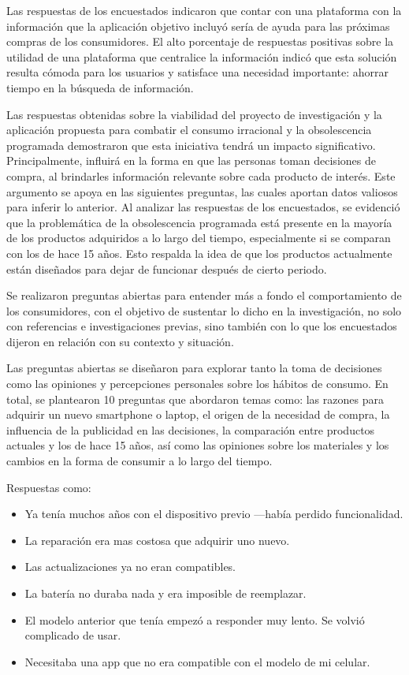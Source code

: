 Las respuestas de los encuestados indicaron que contar con una plataforma con la
información que la aplicación objetivo incluyó sería de ayuda para las
próximas compras de los consumidores. El alto porcentaje de respuestas positivas
sobre la utilidad de una plataforma que centralice la información indicó que
esta solución resulta cómoda para los usuarios y satisface una necesidad
importante: ahorrar tiempo en la búsqueda de información.

Las respuestas obtenidas sobre la viabilidad del proyecto de investigación y la
aplicación propuesta para combatir el consumo irracional y la obsolescencia
programada demostraron que esta iniciativa tendrá un impacto significativo.
Principalmente, influirá en la forma en que las personas toman decisiones de
compra, al brindarles información relevante sobre cada producto de interés. Este
argumento se apoya en las siguientes preguntas, las cuales aportan datos
valiosos para inferir lo anterior. Al analizar las respuestas de los
encuestados, se evidenció que la problemática de la obsolescencia programada
está presente en la mayoría de los productos adquiridos a lo largo del tiempo,
especialmente si se comparan con los de hace 15 años. Esto respalda la idea de
que los productos actualmente están diseñados para dejar de funcionar después de
cierto periodo.

Se realizaron preguntas abiertas para entender más a fondo el comportamiento de
los consumidores, con el objetivo de sustentar lo dicho en la investigación, no
solo con referencias e investigaciones previas, sino también con lo que los
encuestados dijeron en relación con su contexto y situación. 

Las preguntas abiertas se diseñaron para explorar tanto la toma de decisiones
como las opiniones y percepciones personales sobre los hábitos de consumo. En
total, se plantearon 10 preguntas que abordaron temas como: las razones para
adquirir un nuevo smartphone o laptop, el origen de la necesidad de compra, la
influencia de la publicidad en las decisiones, la comparación entre productos
actuales y los de hace 15 años, así como las opiniones sobre los materiales y
los cambios en la forma de consumir a lo largo del tiempo.

Respuestas como:
\begin{itemize}
    \item Ya tenía muchos años con el dispositivo previo —había perdido funcionalidad.
    \item La reparación era mas costosa que adquirir uno nuevo.
    \item Las actualizaciones ya no eran compatibles.
    \item La batería no duraba nada y era imposible de reemplazar.
    \item El modelo anterior que tenía empezó a responder muy lento. Se volvió complicado de usar. 
    \item Necesitaba una app que no era compatible con el modelo de mi celular.
\end{itemize}

